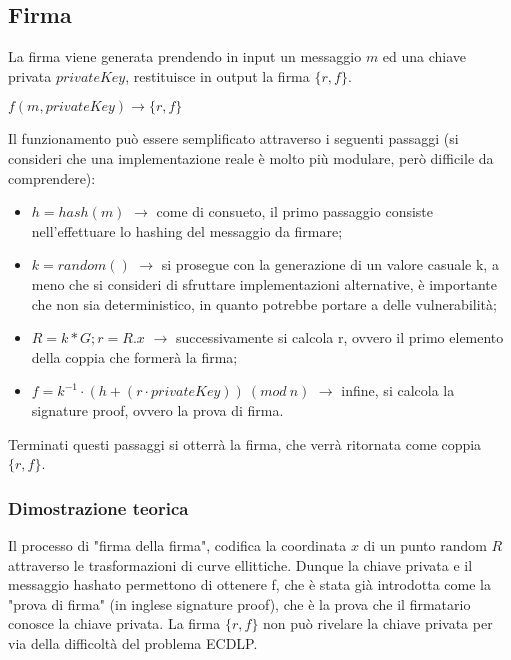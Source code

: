 \newpage

\subsection{Firma}
 
La firma viene generata prendendo in input un messaggio $m$ ed una chiave privata $privateKey$, restituisce in output la firma $\{r, f\}$.

\begin{center}
	$f(m, privateKey) \rightarrow \{r, f\}$
\end{center}

Il funzionamento può essere semplificato attraverso i seguenti passaggi (si consideri che una implementazione reale è molto più modulare, però difficile da comprendere):
\begin{itemize}
	\item $h = hash(m)$  $\rightarrow$ come di consueto, il primo passaggio consiste nell'effettuare lo hashing del messaggio da firmare;
	\item $k = random()$ $\rightarrow$ si prosegue con la generazione di un valore casuale k, a meno che si consideri di sfruttare implementazioni alternative, è importante che non sia deterministico, in quanto potrebbe portare a delle vulnerabilità;
	\item $R = k * G; r = R.x $ $\rightarrow$ successivamente si calcola r, ovvero il primo elemento della coppia che formerà la firma;
	\item $f = k^{-1} \cdot (h + (r \cdot privateKey)) \: (mod \: n)$ $\rightarrow$ infine, si calcola la signature proof, ovvero la prova di firma.
\end{itemize}

Terminati questi passaggi si otterrà la firma, che verrà ritornata come coppia $\{r, f\}$.

\subsubsection{Dimostrazione teorica}

Il processo di "firma della firma", codifica la coordinata $x$ di un punto random $R$ attraverso le trasformazioni di curve ellittiche. Dunque la chiave privata e il messaggio hashato permettono di ottenere f, che è stata già introdotta come la "prova di firma" (in inglese signature proof), che è la prova che il firmatario conosce la chiave privata. La firma $\{r, f\}$ non può rivelare la chiave privata per via della difficoltà del problema ECDLP.

